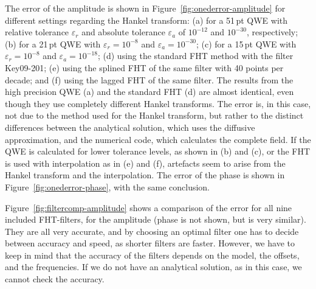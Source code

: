 \documentclass[manuscript,revised]{geophysics}
\begin{document}
The error of the amplitude is shown in Figure~\ref{fig:onederror-amplitude} for
different settings regarding the Hankel transform: (a) for a 51\,pt QWE with
relative tolerance $\varepsilon_r$ and absolute tolerance $\varepsilon_a$ of
$10^{-12}$ and $10^{-30}$, respectively; (b) for a 21\,pt QWE with
$\varepsilon_r = 10^{-8}$ and $\varepsilon_a = 10^{-30}$; (c) for a 15\,pt QWE
with $\varepsilon_r = 10^{-8}$ and $\varepsilon_a = 10^{-18}$; (d) using the
standard FHT method with the filter Key09-201; (e) using the splined FHT of the
same filter with 40 points per decade; and (f) using the lagged FHT of the same
filter.
%
%
The results from the high precision QWE (a) and the standard FHT (d) are almost
identical, even though they use completely different Hankel transforms. The
error is, in this case, not due to the method used for the Hankel transform,
but rather to the distinct differences between the analytical solution, which
uses the diffusive approximation, and the numerical code, which calculates the
complete field. If the QWE is calculated for lower tolerance levels, as shown
in (b) and (c), or the FHT is used with interpolation as in (e) and (f),
artefacts seem to arise from the Hankel transform and the interpolation. The
error of the phase is shown in Figure~\ref{fig:onederror-phase}, with the same
conclusion.
%
%

Figure~\ref{fig:filtercomp-amplitude} shows a comparison of the error for all
nine included FHT-filters, for the amplitude (phase is not shown, but is very
similar). They are all very accurate, and by choosing an optimal filter one has
to decide between accuracy and speed, as shorter filters are faster. However,
we have to keep in mind that the accuracy of the filters depends on the model,
the offsets, and the frequencies. If we do not have an analytical solution, as
in this case, we cannot check the accuracy.
%
%
\end{document}
